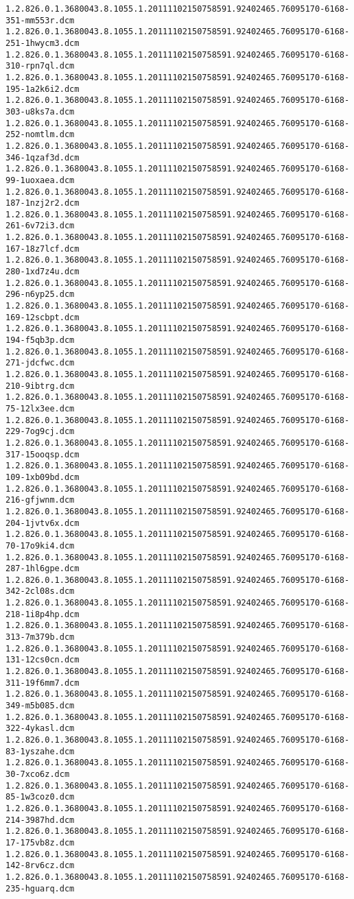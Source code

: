 \begin{lstlisting}
1.2.826.0.1.3680043.8.1055.1.20111102150758591.92402465.76095170-6168-351-mm553r.dcm 1.2.826.0.1.3680043.8.1055.1.20111102150758591.92402465.76095170-6168-251-1hwycm3.dcm 1.2.826.0.1.3680043.8.1055.1.20111102150758591.92402465.76095170-6168-310-rpn7ql.dcm 1.2.826.0.1.3680043.8.1055.1.20111102150758591.92402465.76095170-6168-195-1a2k6i2.dcm 1.2.826.0.1.3680043.8.1055.1.20111102150758591.92402465.76095170-6168-303-u8ks7a.dcm 1.2.826.0.1.3680043.8.1055.1.20111102150758591.92402465.76095170-6168-252-nomtlm.dcm 1.2.826.0.1.3680043.8.1055.1.20111102150758591.92402465.76095170-6168-346-1qzaf3d.dcm 1.2.826.0.1.3680043.8.1055.1.20111102150758591.92402465.76095170-6168-99-1uoxaea.dcm 1.2.826.0.1.3680043.8.1055.1.20111102150758591.92402465.76095170-6168-187-1nzj2r2.dcm 1.2.826.0.1.3680043.8.1055.1.20111102150758591.92402465.76095170-6168-261-6v72i3.dcm 1.2.826.0.1.3680043.8.1055.1.20111102150758591.92402465.76095170-6168-167-18z7lcf.dcm 1.2.826.0.1.3680043.8.1055.1.20111102150758591.92402465.76095170-6168-280-1xd7z4u.dcm 1.2.826.0.1.3680043.8.1055.1.20111102150758591.92402465.76095170-6168-296-n6yp25.dcm 1.2.826.0.1.3680043.8.1055.1.20111102150758591.92402465.76095170-6168-169-12scbpt.dcm 1.2.826.0.1.3680043.8.1055.1.20111102150758591.92402465.76095170-6168-194-f5qb3p.dcm 1.2.826.0.1.3680043.8.1055.1.20111102150758591.92402465.76095170-6168-271-jdcfwc.dcm 1.2.826.0.1.3680043.8.1055.1.20111102150758591.92402465.76095170-6168-210-9ibtrg.dcm 1.2.826.0.1.3680043.8.1055.1.20111102150758591.92402465.76095170-6168-75-12lx3ee.dcm 1.2.826.0.1.3680043.8.1055.1.20111102150758591.92402465.76095170-6168-229-7og9cj.dcm 1.2.826.0.1.3680043.8.1055.1.20111102150758591.92402465.76095170-6168-317-15ooqsp.dcm 1.2.826.0.1.3680043.8.1055.1.20111102150758591.92402465.76095170-6168-109-1xb09bd.dcm 1.2.826.0.1.3680043.8.1055.1.20111102150758591.92402465.76095170-6168-216-gfjwnm.dcm 1.2.826.0.1.3680043.8.1055.1.20111102150758591.92402465.76095170-6168-204-1jvtv6x.dcm 1.2.826.0.1.3680043.8.1055.1.20111102150758591.92402465.76095170-6168-70-17o9ki4.dcm 1.2.826.0.1.3680043.8.1055.1.20111102150758591.92402465.76095170-6168-287-1hl6gpe.dcm 1.2.826.0.1.3680043.8.1055.1.20111102150758591.92402465.76095170-6168-342-2cl08s.dcm 1.2.826.0.1.3680043.8.1055.1.20111102150758591.92402465.76095170-6168-218-1i8p4hp.dcm 1.2.826.0.1.3680043.8.1055.1.20111102150758591.92402465.76095170-6168-313-7m379b.dcm 1.2.826.0.1.3680043.8.1055.1.20111102150758591.92402465.76095170-6168-131-12cs0cn.dcm 1.2.826.0.1.3680043.8.1055.1.20111102150758591.92402465.76095170-6168-311-19f6mm7.dcm 1.2.826.0.1.3680043.8.1055.1.20111102150758591.92402465.76095170-6168-349-m5b085.dcm 1.2.826.0.1.3680043.8.1055.1.20111102150758591.92402465.76095170-6168-322-4ykasl.dcm 1.2.826.0.1.3680043.8.1055.1.20111102150758591.92402465.76095170-6168-83-1yszahe.dcm 1.2.826.0.1.3680043.8.1055.1.20111102150758591.92402465.76095170-6168-30-7xco6z.dcm 1.2.826.0.1.3680043.8.1055.1.20111102150758591.92402465.76095170-6168-85-1w3coz0.dcm 1.2.826.0.1.3680043.8.1055.1.20111102150758591.92402465.76095170-6168-214-3987hd.dcm 1.2.826.0.1.3680043.8.1055.1.20111102150758591.92402465.76095170-6168-17-175vb8z.dcm 1.2.826.0.1.3680043.8.1055.1.20111102150758591.92402465.76095170-6168-142-8rv6cz.dcm 1.2.826.0.1.3680043.8.1055.1.20111102150758591.92402465.76095170-6168-235-hguarq.dcm

\end{lstlisting}
